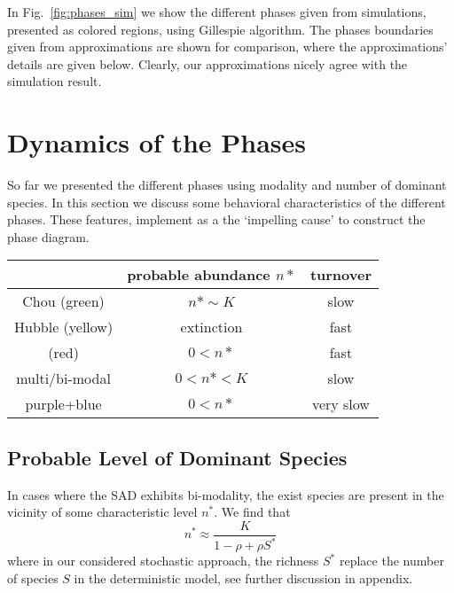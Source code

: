 \documentclass[%
 amsmath,amssymb,
 reprint,%
]{revtex4-2}
\begin{document}
In Fig.~\ref{fig:phases_sim} we show the different phases given from simulations, presented as colored regions, using Gillespie algorithm. The phases boundaries given from approximations are shown for comparison, where the approximations' details are given below. Clearly, our approximations nicely agree with 
the simulation result. 

\section{Dynamics of the Phases}

So far we presented the different phases using modality and number of dominant species. In this section we discuss some behavioral characteristics of the different phases. These features, implement as a the `impelling cause' to construct the phase diagram.     
 

\begin{tabular}{c|c c}
\hline
     & probable abundance $n*$ & \hspace{0.1cm} turnover   \\ \hline
    Chou (green) & $n*\sim K$ & slow \\
    Hubble (yellow) & extinction & fast \\
    (red) & $0<n*$ & fast \\
    multi/bi-modal &  $0<n*<K$ & slow \\
    purple+blue & $0<n*$ & very slow \\ \hline
\end{tabular} 
 
\subsection{Probable Level of Dominant Species}

In cases where the SAD exhibits bi-modality, the exist species are present in the vicinity of some characteristic level $n^*$. We find that
\begin{equation}
    n^*\approx \frac{K}{1-\rho+\rho S^*}
\end{equation}
where in our considered stochastic approach, the richness $S^*$ replace the number of species $S$ in the deterministic model, see further discussion in appendix. 
\end{document}
